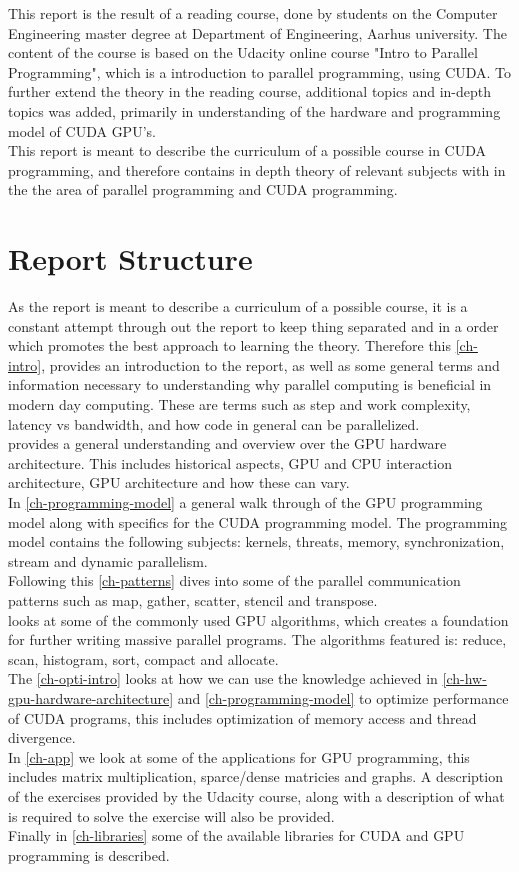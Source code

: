 This report is the result of a reading course, done by students on the Computer Engineering master degree at Department of Engineering, Aarhus university. The content of the course is based on the Udacity online course "Intro to Parallel Programming", which is a introduction to parallel programming, using CUDA. To further extend the theory in the reading course, additional topics and in-depth topics was added, primarily in understanding of the hardware and programming model of CUDA GPU's.\\
This report is meant to describe the curriculum of a possible course in CUDA programming, and therefore contains in depth theory of relevant subjects with in the the area of parallel programming and CUDA programming.

	\section{Report Structure}
	\label{sec-rep-struc}
	As the report is meant to describe a curriculum of a possible course, it is a constant attempt through out the report to keep thing separated and in a order which promotes the best approach to learning the theory. Therefore this \cref{ch-intro}, provides an introduction to the report, as well as some general terms and information necessary to understanding why parallel computing is beneficial in modern day computing. These are terms such as step and work complexity, latency vs bandwidth, and how code in general can be parallelized.\\
	 provides a general understanding and overview over the GPU hardware architecture. This includes historical aspects, GPU and CPU interaction architecture, GPU architecture and how these can vary.\\
	In \cref{ch-programming-model} a general walk through of the GPU programming model along with specifics for the CUDA programming model. The programming model contains the following subjects: kernels, threats, memory, synchronization, stream and dynamic parallelism.\\
	Following this \cref{ch-patterns} dives into some of the parallel communication patterns such as map, gather, scatter, stencil and transpose.\\
	 looks at some of the commonly used GPU algorithms, which creates a foundation for further writing massive parallel programs. The algorithms featured is: reduce, scan, histogram, sort, compact and allocate.\\
	The \cref{ch-opti-intro} looks at how we can use the knowledge achieved in \cref{ch-hw-gpu-hardware-architecture} and \cref{ch-programming-model} to optimize performance of CUDA programs, this includes optimization of memory access and thread divergence.\\
	In \cref{ch-app} we look at some of the applications for GPU programming, this includes matrix multiplication, sparce/dense matricies and graphs. A description of the exercises provided by the Udacity course, along with a description of what is required to solve the exercise will also be provided.\\
	Finally in \cref{ch-libraries} some of the available libraries for CUDA and GPU programming is described.
